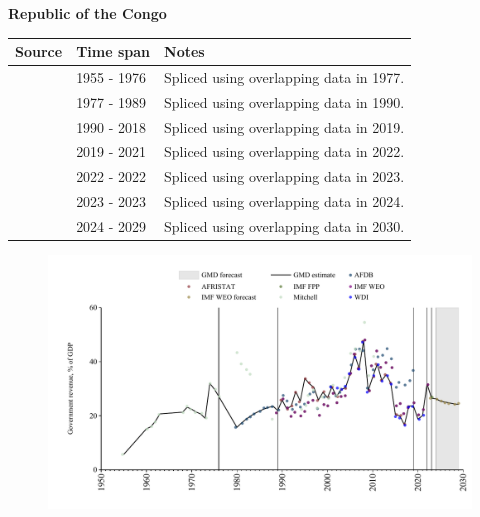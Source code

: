 \documentclass[12pt,a4paper,landscape]{article}
\begin{document}
\begin{adjustbox}{max totalsize={\paperwidth}{\paperheight},center}
\begin{minipage}[t][\textheight][t]{\textwidth}
\vspace*{0.5cm}
{}
\begin{center}
{\Large\bfseries Republic of the Congo}
\end{center}
\vspace{0.5cm}
\begin{table}[H]
\centering
\small
\begin{tabular}{|l|l|l|}
\hline
\textbf{Source} & \textbf{Time span} & \textbf{Notes} \\
\hline
\rowcolor{white}\cite{Mitchell}& 1955 - 1976 &Spliced using overlapping data in 1977.\\
\rowcolor{lightgray}\cite{AFDB}& 1977 - 1989 &Spliced using overlapping data in 1990.\\
\rowcolor{white}\cite{AFRISTAT}& 1990 - 2018 &Spliced using overlapping data in 2019.\\
\rowcolor{lightgray}\cite{WDI}& 2019 - 2021 &Spliced using overlapping data in 2022.\\
\rowcolor{white}\cite{IMF_WEO}& 2022 - 2022 &Spliced using overlapping data in 2023.\\
\rowcolor{lightgray}\cite{IMF_FPP}& 2023 - 2023 &Spliced using overlapping data in 2024.\\
\rowcolor{white}\cite{IMF_WEO_forecast}& 2024 - 2029 &Spliced using overlapping data in 2030.\\
\hline
\end{tabular}
\end{table}
\begin{figure}[H]
\centering
\includegraphics[width=\textwidth,height=0.6\textheight,keepaspectratio]{graphs/COG_govrev_GDP.pdf}
\end{figure}
\end{minipage}
\end{adjustbox}
\end{document}
